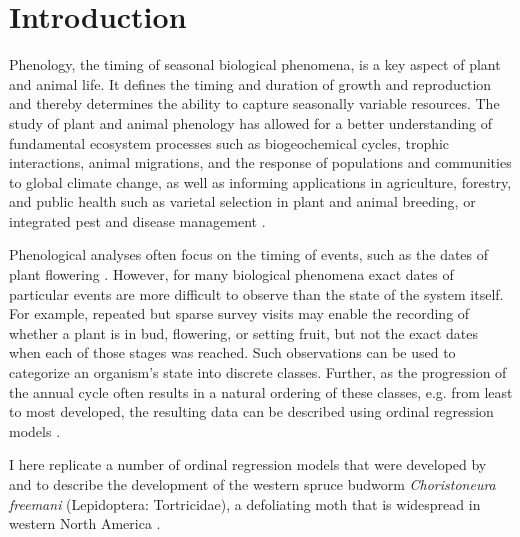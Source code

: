 \section{Introduction}

Phenology, the timing of seasonal biological phenomena, is a key aspect of plant and animal life.
It defines the timing and duration of growth and reproduction and thereby determines the ability to capture seasonally variable resources.
The study of plant and animal phenology has allowed for a better understanding of fundamental ecosystem processes such as biogeochemical cycles,
trophic interactions, animal migrations, and the response of populations and communities to global climate change,
as well as informing applications in agriculture, forestry, and public health such as varietal selection in plant and animal breeding, or integrated pest and disease management \citep{chuine2017process}.

Phenological analyses often focus on the timing of events, such as the dates of plant flowering \citep{aono2008phenological}.%
However, for many biological phenomena exact dates of particular events are more difficult to observe than the state of the system itself.
For example, repeated but sparse survey visits may enable the recording of whether a plant is in bud, flowering, or setting fruit, but not the exact dates when each of those stages was reached.
Such observations can be used to categorize an organism's state into discrete classes.
Further, as the progression of the annual cycle often results in a natural ordering of these classes, e.g. from least to most developed, the resulting data can be described using ordinal regression models \cite{mccullagh1980regression,agresti2010analysis}.

I here replicate a number of ordinal regression models that were developed by \citet{dennis1986stochastic} and \citet{candy1991modeling} to describe the development of the western spruce budworm \emph{Choristoneura freemani} (Lepidoptera: Tortricidae), a defoliating moth that is widespread in western North America \citep{brookes1987western}.